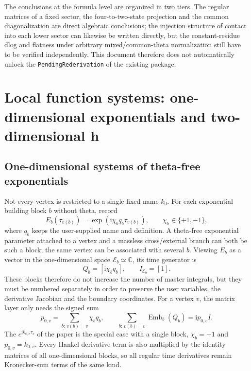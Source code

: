 \documentclass[11pt,a4paper]{article}
\newcommand{\ii}{\mathrm i}
\newcommand{\cE}{\mathcal E}
\newcommand{\Emb}{\operatorname{Emb}}
\begin{document}
The conclusions at the formula level are organized in two tiers. The regular matrices of a fixed sector, the four-to-two-state projection and the common diagonalization are direct algebraic conclusions; the injection structure of contact into each lower sector can likewise be written directly, but the constant-residue dlog and flatness under arbitrary mixed/common-theta normalization still have to be verified independently. This document therefore does not automatically unlock the \texttt{PendingRederivation} of the existing package.

\section{Local function systems: one-dimensional exponentials and two-dimensional h}
\label{sec:local-function-system}

\subsection{One-dimensional systems of theta-free exponentials}

Not every vertex is restricted to a single fixed-name $k_0$. For each exponential building block $b$ without theta, record
\begin{equation}
 E_b(\tau_{v(b)})
 =\exp\!\left(\ii\chi_bq_b\tau_{v(b)}\right),
 \qquad \chi_b\in\{+1,-1\},
 \label{eq:phase-exponent-block}
\end{equation}
where $q_b$ keeps the user-supplied name and definition. A theta-free exponential parameter attached to a vertex and a massless cross/external branch can both be such a block; the same vertex can be associated with several $b$. Viewing $E_b$ as a vector in the one-dimensional space $\cE_b\simeq\mathbb C$, its time generator is
\begin{equation}
 Q_b=[\ii\chi_bq_b],
 \qquad I_{\cE_b}=[1].
 \label{eq:exponential-1d}
\end{equation}
These blocks therefore do not increase the number of master integrals, but they must be numbered separately in order to preserve the user variables, the derivative Jacobian and the boundary coordinates. For a vertex $v$, the matrix layer only needs the signed sum
\begin{equation}
 p_{0,v}=\sum_{b:\,v(b)=v}\chi_bq_b,
 \qquad
 \sum_{b:\,v(b)=v}\Emb_b(Q_b)=\ii p_{0,v}I.
 \label{eq:vertex-signed-phase-energy}
\end{equation}
The $e^{\ii k_{0,v}\tau_v}$ of the paper is the special case with a single block, $\chi_b=+1$ and $p_{0,v}=k_{0,v}$. Every Hankel derivative term is also multiplied by the identity matrices of all one-dimensional blocks, so all regular time derivatives remain Kronecker-sum terms of the same kind.
\end{document}
